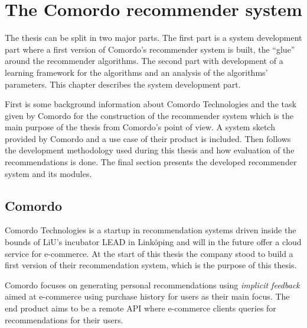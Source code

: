 
\chapter{The Comordo recommender system}\label{cha:recsys}

The thesis can be split in two major parts. The first part is a system development part where a first version of Comordo's recommender system is built, the ``glue'' around the recommender algorithms. The second part with development of a learning framework for the algorithms and an analysis of the algorithms' parameters. This chapter describes the system development part.

First is some background information about Comordo Technologies and the task given by Comordo for the construction of the recommender system which is the main purpose of the thesis from Comordo's point of view. A system sketch provided by Comordo and a use case of their product is included. Then follows the development methodology used during this thesis and how evaluation of the recommendations is done. The final section presents the developed recommender system and its modules.


\section{Comordo}

Comordo Technologies is a startup in recommendation systems driven inside the bounds of LiU's incubator LEAD in Linköping and will in the future offer a cloud service for e-commerce. At the start of this thesis the company stood to build a first version of their recommendation system, which is the purpose of this thesis.

Comordo focuses on generating personal recommendations using \textit{implicit feedback} aimed at e-commerce using purchase history for users as their main focus. The end product aims to be a remote API where e-commerce clients queries for recommendations for their users.







\newpage
